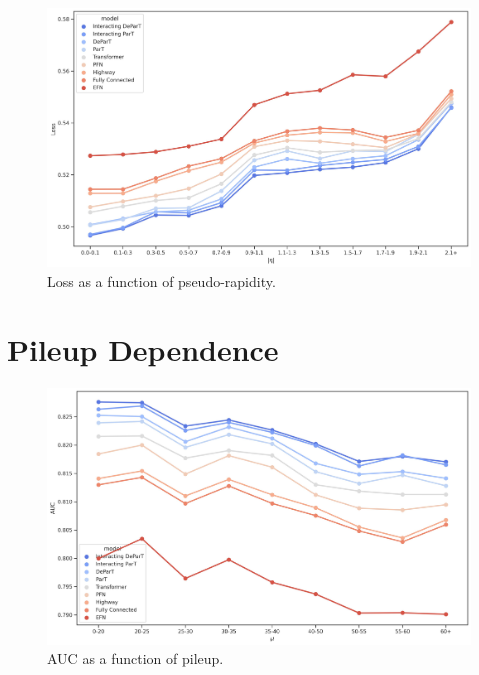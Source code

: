 \begin{figure}[htb]
    \centering
    \includegraphics[width=1\linewidth]{src/plots/results/eta_dep/loss.jpg}
    \caption{Loss as a function of pseudo-rapidity.}
    \label{fig:loss_eta}
\end{figure}

\FloatBarrier

\section{Pileup Dependence}
\label{sec:app_pileup_dep}

\begin{figure}[htb]
    \centering
    \includegraphics[width=1\linewidth]{src/plots/results/mu_dep/auc.jpg}
    \caption{AUC as a function of pileup.}
    \label{fig:auc_pileup}
\end{figure}

